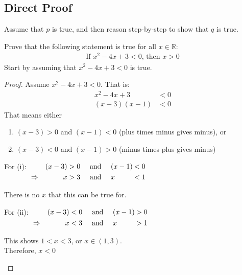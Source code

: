 \documentclass[../notes.tex]{subfiles}
\begin{document}
			\subsection{Direct Proof}
				Assume that $p$ is true, and then reason step-by-step to show that $q$ is true.
				\begin{example}
					Prove that the following statement is true for all $x \in \mathbb{R}$:
					\begin{align*}
						\text{If } x^{2} - 4x + 3 < 0 \text{, then } x > 0
					\end{align*}
					Start by assuming that $x^{2} - 4x + 3 < 0$ is true.
					\begin{proof}
						Assume $x^{2} - 4x + 3 < 0$. That is:
						\begin{align*}
							x^{2} - 4x + 3 &< 0\\
							(x - 3)(x - 1) &< 0 \tag*{(by factorisation)}
						\end{align*}
						That means either 
							\begin{enumerate}[label=(\roman*)]
								\item $(x - 3) > 0$ and $(x - 1) < 0$ (plus times minus gives minus), or
								\item $(x - 3) < 0$ and $(x - 1) > 0$ (minus times plus gives minus)
							\end{enumerate}
						For (i):
						$ \begin{alignedat}[t]{3}
								& & (x - 3) &> 0 \quad \text{ and }\quad  (x - 1) \: &< 0\\
								& \Rightarrow \quad & x &> 3 \quad \text{ and } \quad x &< 1
							\end{alignedat} $
						\begin{indentparagraph}
							There is no $x$ that this can be true for.
						\end{indentparagraph}
						For (ii):
						$ \begin{alignedat}[t]{3}
								& & (x - 3) &< 0 \quad \text{ and }\quad  (x - 1) \: &> 0\\
								& \Rightarrow \quad & x &< 3 \quad \text{ and } \quad x &> 1
						\end{alignedat} $
							\begin{indentparagraph}
								This shows $1 < x < 3$, or $x \in (1, 3)$.\\
								Therefore, $x < 0$
							\end{indentparagraph}
					\end{proof}
				\end{example}
			\pagebreak
\end{document}
